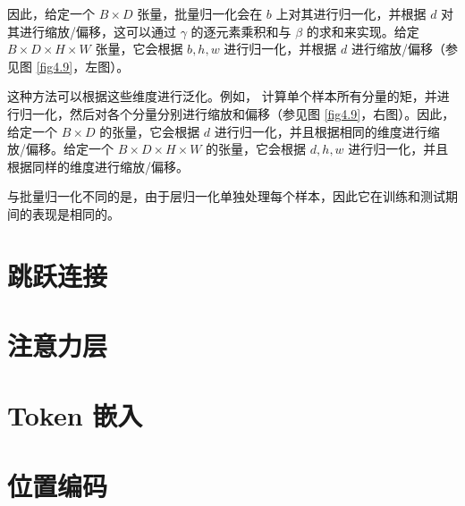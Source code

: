 因此，给定一个 $B \times D$ 张量，批量归一化会在 $b$ 上对其进行归一化，并根据 $d$ 对其进行缩放/偏移，这可以通过 $\gamma$ 的逐元素乘积和与 $\beta$ 的求和来实现。给定 $B \times D \times H \times W$ 张量，它会根据 $b,h,w$ 进行归一化，并根据 $d$ 进行缩放/偏移（参见图 \ref{fig4.9}，左图）。

这种方法可以根据这些维度进行泛化。例如， \citep{arxiv-1607.06450} 计算单个样本所有分量的矩，并进行归一化，然后对各个分量分别进行缩放和偏移（参见图 \ref{fig4.9}，右图）。因此，给定一个 $B \times D$ 的张量，它会根据 $d$ 进行归一化，并且根据相同的维度进行缩放/偏移。给定一个 $B \times D \times H \times W$ 的张量，它会根据 $d,h,w$ 进行归一化，并且根据同样的维度进行缩放/偏移。

\newpage

与批量归一化不同的是，由于层归一化单独处理每个样本，因此它在训练和测试期间的表现是相同的。

\section{跳跃连接}\label{sec4.7}

\section{注意力层}\label{sec4.8}

\section{Token 嵌入}\label{sec4.9}

\section{位置编码}\label{sec4.10}